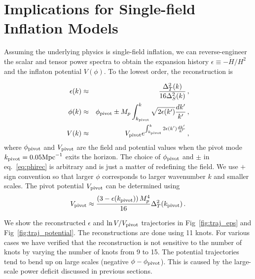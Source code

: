 \documentclass[a4paper,11pt]{article}
\begin{document}
\section{Implications for Single-field Inflation Models}

Assuming the underlying physics is single-field inflation, we can reverse-engineer the scalar and tensor power spectra to obtain the expansion history $\epsilon \equiv -\dot H/ H^2$ and the inflaton potential $V(\phi)$. To the lowest order, the reconstruction is

\begin{eqnarray}
  \epsilon(k) & \approx & \frac{\Delta^2_T(k)}{16\Delta^2_S(k)} \, , \\
  \phi(k) & \approx & \phi_{\rm pivot} \pm M_p\int^k_{k_{\rm pivot}} \sqrt{2\epsilon(k')} \frac{dk'}{k'}\, , \label{eq:phirec} \\
  V(k) & \approx & V_{\rm pivot}e^{\int^k_{k_{\rm pivot}} 2\epsilon(k') \frac{dk'}{k'}}\, ,
\end{eqnarray}
where $\phi_{\rm pivot}$ and $V_{\rm pivot}$ are the field and potential values when the pivot mode $k_{\rm pivot} = 0.05 {\rm Mpc}^{-1}$ exits the horizon. The choice of $\phi_{\rm pivot}$ and $\pm$ in eq.~\eqref{eq:phirec} is arbitrary and is just a matter of redefining the field. We use $+$ sign convention so that larger $\phi$ corresponds to larger wavenumber $k$ and smaller scales. The pivot potential $V_{\rm pivot}$ can be determined using 
\begin{equation}
V_{\rm pivot} \approx \frac{\left(3-\epsilon(k_{\rm pivot})\right)M_p^4}{16} \Delta^2_T(k_{\rm pivot}) \, .
\end{equation}

We show the reconstructed $\epsilon$ and $\ln V/V_{\rm pivot}$ trajectories in Fig~\ref{fig:traj_eps} and Fig~\ref{fig:traj_potential}. The reconstructions are done using 11 knots. For various cases we have verified that the reconstruction is not sensitive to the number of knots by varying the number of knots from 9 to 15. The potential trajectories tend to bend up on large scales (negative $\phi - \phi_{\rm pivot}$). This is caused by the large-scale power deficit discussed in previous sections. 
\end{document}
